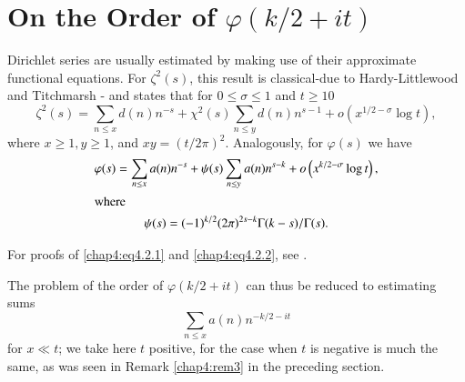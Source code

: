 \section{On the Order of $\varphi(k /2+it)$}\label{chap4:sec4.2}

Dirichlet series are usually estimated by making use of their
approximate functional equations. For $\zeta^2(s)$, this result is
classical-due to Hardy-Littlewood and Titchmarsh - and states that for
$0\leq\sigma\leq 1$ and $t\geq 10$ 
\begin{equation}\label{chap4:eq4.2.1}
\zeta^2(s)=\sum\limits_{n\leq x}d(n)n^{-s}+\chi^2(s)\sum\limits_{n\leq
  y}d(n) n^{s-1}+o\left(x^{1/2-\sigma}\log t\right), 
\end{equation}\pageoriginale
where $x\geq 1, y\geq 1$, and $xy=(t/2\pi)^2$. Analogously, for
$\varphi(s)$ we have  
\begin{gather}
\varphi(s)=\sum\limits_{n\leq x}a(n)n^{-s}+\psi(s)\sum\limits_{n\leq
  y}a(n) n^{s-k }+o\left(x^{k /2-\sigma}\log
t\right),\label{chap4:eq4.2.2}\\ 
\intertext{where}
\psi(s)=(-1)^{k /2}(2\pi)^{2s-k }\Gamma(k -s)/\Gamma(s).\notag
\end{gather}

For proofs of \eqref{chap4:eq4.2.1} and \eqref{chap4:eq4.2.2}, see \eg
\cite{key19}. 

The problem of the order of $\varphi(k /2+it)$ can thus be reduced to
estimating sums 
\begin{equation}\label{chap4:eq4.2.3}
\sum\limits_{n\leq x}a(n)n^{-k /2-it}
\end{equation}
for $x\ll t$; we take here $t$ positive, for the case when $t$ is negative is much the same, as was seen in Remark \ref{chap4:rem3} in the preceding section. 

